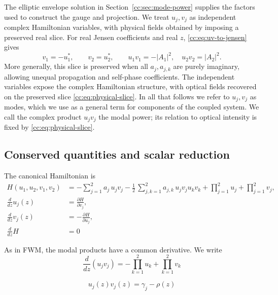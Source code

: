 \documentclass[11pt,a4paper]{article}
\begin{document}
The elliptic envelope solution in Section~\ref{cc:sec:mode-power} supplies the factors used to construct the gauge and projection.
We treat $u_j,v_j$ as independent complex Hamiltonian variables, with physical fields obtained by imposing a preserved real slice.
For real Jensen coefficients and real $z$, \eqref{cc:eq:uv-to-jensen} gives
\begin{equation}
v_1=-u_1^*,\qquad v_2=u_2^*,\qquad
u_1v_1=-|A_1|^2,\quad u_2v_2=|A_2|^2.
\label{cc:eq:physical-slice}
\end{equation}
More generally, this slice is preserved when all $a_j,a_{j,k}$ are purely imaginary, allowing unequal propagation and self-phase coefficients.
The independent variables expose the complex Hamiltonian structure, with optical fields recovered on the preserved slice \eqref{cc:eq:physical-slice}.
In all that follows we refer to $u_j, v_j$ as modes, which we use as a general term for components of the coupled system.
We call the complex product $u_jv_j$ the modal power; its relation to optical intensity is fixed by \eqref{cc:eq:physical-slice}.




\subsection{Conserved quantities and scalar reduction}
The canonical Hamiltonian is
\begin{align}
\label{cc:eq:ham-uv}
H(u_1, u_2, v_1, v_2) &= -\sum_{j=1}^{2} a_{j}\, u_j v_j - \frac{1}{2}\,\sum_{j,k=1}^{2} a_{j,k}\, u_j v_j u_k v_k + \prod\limits_{j=1}^{2} u_j + \prod\limits_{j=1}^{2} v_j, \\
\frac{d}{d z} u_j{\left(z \right)} &= \frac{\partial H}{\partial v_j}, \\
\frac{d}{d z} v_j{\left(z \right)} &= -\frac{\partial H}{\partial u_j}, \\
\frac{d}{d z} H &= 0
\end{align}

As in FWM, the modal products have a common derivative. We write
\begin{equation}
\label{cc:eq:duv_j}
\frac{d}{d z}\left(u_j v_j\right) = - \prod\limits_{k=1}^{2} u_k + \prod\limits_{k=1}^{2} v_k
\end{equation}

\begin{equation}
\label{cc:eq:uvj-gam-rho}
u_j(z) v_j(z) = \gamma_j - \rho(z)
\end{equation}
\end{document}
